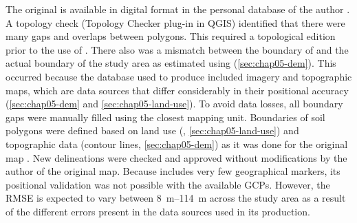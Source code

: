 

The original \soilNew{} is available in digital format in the personal database of the author 
\cite{Miguel2010}. A topology check (Topology Checker plug-in in QGIS) identified that there were many gaps 
and overlaps between polygons. This required a topological edition prior to the use of \soilNew. There also 
was a mismatch between the boundary of \soilNew{} and the actual boundary of the study area as estimated using 
\demNew{} (\autoref{sec:chap05-dem}). This occurred because the database used to produce \soilNew{} 
included \googleearth{} imagery and topographic maps, which are data sources that differ considerably in their 
positional accuracy (\autoref{sec:chap05-dem} and \autoref{sec:chap05-land-use}). To avoid data 
losses, all boundary gaps were manually filled using the closest mapping unit. Boundaries of soil polygons 
were defined based on land use (\landNew{}, \autoref{sec:chap05-land-use}) and topographic data (contour 
lines, \autoref{sec:chap05-dem}) as it was done for the original map \cite{Miguel2010}. New delineations were 
checked and approved without modifications by the author of the original map. Because \soilNew{} includes very 
few geographical markers, its positional validation was not possible with the available GCPs. However, the 
RMSE is expected to vary between \SIrange{8}{114}{\m} across the study area as a result of the different 
errors present in the data sources used in its production.

